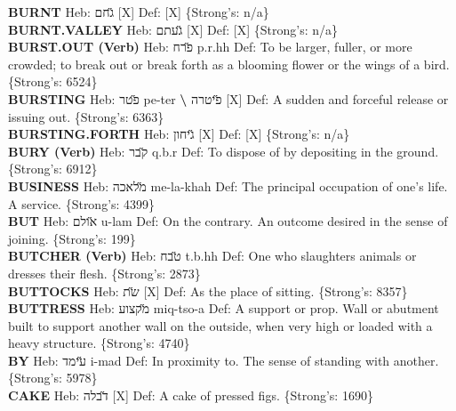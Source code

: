 {\textbf{BURNT} Heb: {\large\H גחם} {[}X{]} Def: {[}X{]} \{Strong's: n/a\}\hfill{}\\

\textbf{BURNT.VALLEY} Heb: {\large\H געתם} {[}X{]} Def: {[}X{]} \{Strong's: n/a\}\hfill{}\\

\textbf{BURST.OUT (Verb)} Heb: {\large\H פרח} p.r.hh Def: To be larger, fuller, or more crowded; to break out or break forth as a blooming flower or the wings of a bird. \{Strong's: 6524\}\hfill{}\\

\textbf{BURSTING} Heb: {\large\H פטר} pe-ter \textbf{\textbackslash{}} {\large\H פיטרה} {[}X{]} Def: A sudden and forceful release or issuing out. \{Strong's: 6363\}\hfill{}\\

\textbf{BURSTING.FORTH} Heb: {\large\H גיחון} {[}X{]} Def: {[}X{]} \{Strong's: n/a\}\hfill{}\\

\textbf{BURY (Verb)} Heb: {\large\H קבר} q.b.r Def: To dispose of by depositing in the ground. \{Strong's: 6912\}\hfill{}\\

\textbf{BUSINESS} Heb: {\large\H מלאכה} me-la-khah Def: The principal occupation of one's life. A service. \{Strong's: 4399\}\hfill{}\\

\textbf{BUT} Heb: {\large\H אולם} u-lam Def: On the contrary. An outcome desired in the sense of joining. \{Strong's: 199\}\hfill{}\\

\textbf{BUTCHER (Verb)} Heb: {\large\H טבח} t.b.hh Def: One who slaughters animals or dresses their flesh. \{Strong's: 2873\}\hfill{}\\

\textbf{BUTTOCKS} Heb: {\large\H שת} {[}X{]} Def: As the place of sitting. \{Strong's: 8357\}\hfill{}\\

\textbf{BUTTRESS} Heb: {\large\H מקצוע} miq-tso-a Def: A support or prop. Wall or abutment built to support another wall on the outside, when very high or loaded with a heavy structure. \{Strong's: 4740\}\hfill{}\\

\textbf{BY} Heb: {\large\H עימד} i-mad Def: In proximity to. The sense of standing with another. \{Strong's: 5978\}\hfill{}\\

\textbf{CAKE} Heb: {\large\H דבלה} {[}X{]} Def: A cake of pressed figs. \{Strong's: 1690\}\hfill{}\\

}
